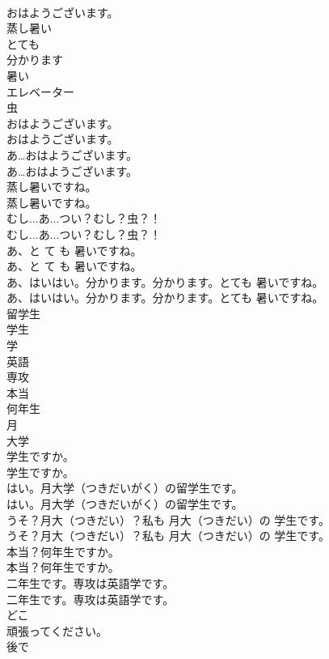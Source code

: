 \documentclass[8pt]{extreport}
\begin{document}
\begin{CJK}{UTF8}{min}
\\	おはようございます。
\\	蒸し暑い
\\	とても
\\	分かります
\\	暑い
\\	エレベーター
\\	虫
\\	おはようございます。	
\\	おはようございます。 
\\	あ…おはようございます。	
\\	あ…おはようございます。 
\\	蒸し暑いですね。	
\\	蒸し暑いですね。 
\\	むし...あ...つい？むし？虫？！	
\\	むし...あ...つい？むし？虫？！ 
\\	あ、と て も 暑いですね。	
\\	あ、と て も 暑いですね。 
\\	あ、はいはい。分かります。分かります。とても 暑いですね。	
\\	あ、はいはい。分かります。分かります。とても 暑いですね。 
\\	留学生
\\	学生
\\	学
\\	英語
\\	専攻
\\	本当
\\	何年生
\\	月
\\	大学
\\	学生ですか。	
\\	学生ですか。 
\\	はい。月大学（つきだいがく）の留学生です。	
\\	はい。月大学（つきだいがく）の留学生です。 
\\	うそ？月大（つきだい）？私も 月大（つきだい）の 学生です。	
\\	うそ？月大（つきだい）？私も 月大（つきだい）の 学生です。 
\\	本当？何年生ですか。	
\\	本当？何年生ですか。 
\\	二年生です。専攻は英語学です。	
\\	二年生です。専攻は英語学です。 
\\	どこ
\\	頑張ってください。
\\	後で

\end{CJK}
\end{document}
